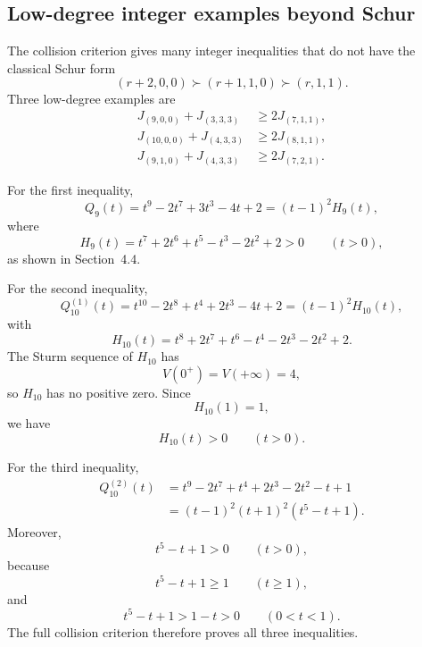 \documentclass[11pt]{article}
\theoremstyle{definition}
\begin{document}
\subsection{Low-degree integer examples beyond Schur}

The collision criterion gives many integer inequalities that do not have the classical Schur form
\begin{equation*}
(r+2,0,0)\succ(r+1,1,0)\succ(r,1,1).
\end{equation*}
Three low-degree examples are
\begin{align*}
J_{(9,0,0)}+J_{(3,3,3)}
&\ge2J_{(7,1,1)},\\
J_{(10,0,0)}+J_{(4,3,3)}
&\ge2J_{(8,1,1)},\\
J_{(9,1,0)}+J_{(4,3,3)}
&\ge2J_{(7,2,1)}.
\end{align*}

For the first inequality,
\begin{equation*}
Q_9(t)
=t^9-2t^7+3t^3-4t+2
=(t-1)^2H_9(t),
\end{equation*}
where
\begin{equation*}
H_9(t)=t^7+2t^6+t^5-t^3-2t^2+2>0
\qquad(t>0),
\end{equation*}
as shown in Section~4.4.

For the second inequality,
\begin{equation*}
Q_{10}^{(1)}(t)
=t^{10}-2t^8+t^4+2t^3-4t+2
=(t-1)^2H_{10}(t),
\end{equation*}
with
\begin{equation*}
H_{10}(t)
=t^8+2t^7+t^6-t^4-2t^3-2t^2+2.
\end{equation*}
The Sturm sequence of \(H_{10}\) has
\begin{equation*}
V(0^+)=V(+\infty)=4,
\end{equation*}
so \(H_{10}\) has no positive zero.  Since
\begin{equation*}
H_{10}(1)=1,
\end{equation*}
we have
\begin{equation*}
H_{10}(t)>0
\qquad(t>0).
\end{equation*}

For the third inequality,
\begin{align*}
Q_{10}^{(2)}(t)
&=t^9-2t^7+t^4+2t^3-2t^2-t+1\\
&=(t-1)^2(t+1)^2(t^5-t+1).
\end{align*}
Moreover,
\begin{equation*}
t^5-t+1>0
\qquad(t>0),
\end{equation*}
because
\begin{equation*}
t^5-t+1\ge1
\qquad(t\ge1),
\end{equation*}
and
\begin{equation*}
t^5-t+1>1-t>0
\qquad(0<t<1).
\end{equation*}
The full collision criterion therefore proves all three inequalities.
\end{document}
